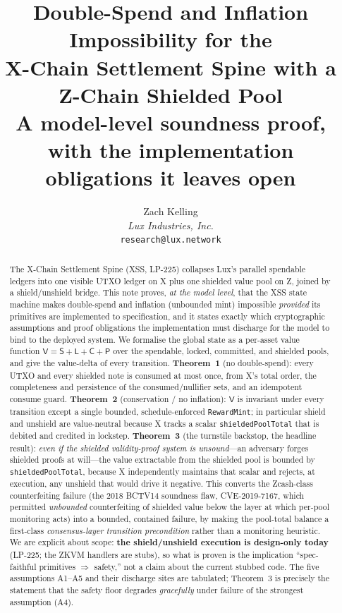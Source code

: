 \documentclass[11pt]{article}
\title{Double-Spend and Inflation Impossibility for the\\
       X-Chain Settlement Spine with a Z-Chain Shielded Pool\\
       {\large A model-level soundness proof, with the implementation
       obligations it leaves open}}
\author{Zach Kelling \\
\textit{Lux Industries, Inc.}\\
\texttt{research@lux.network}}
\date{}
\theoremstyle{definition}
\theoremstyle{remark}
\newcommand{\Val}{\mathsf{V}}
\newcommand{\spend}{\mathsf{S}}
\newcommand{\lock}{\mathsf{L}}
\newcommand{\commit}{\mathsf{C}}
\newcommand{\pool}{\mathsf{P}}
\begin{document}
\maketitle

\begin{abstract}
The X-Chain Settlement Spine (XSS, LP-225) collapses Lux's parallel
spendable ledgers into one visible UTXO ledger on X plus one shielded
value pool on Z, joined by a shield/unshield bridge. This note proves,
\emph{at the model level}, that the XSS state machine makes double-spend
and inflation (unbounded mint) impossible \emph{provided} its primitives
are implemented to specification, and it states exactly which
cryptographic assumptions and proof obligations the implementation must
discharge for the model to bind to the deployed system. We formalise the
global state as a per-asset value function
$\Val = \spend + \lock + \commit + \pool$ over the spendable, locked,
committed, and shielded pools, and give the value-delta of every
transition. \textbf{Theorem~1} (no double-spend): every UTXO and every
shielded note is consumed at most once, from X's total order, the
completeness and persistence of the consumed/nullifier sets, and an
idempotent consume guard. \textbf{Theorem~2} (conservation / no
inflation): $\Val$ is invariant under every transition except a single
bounded, schedule-enforced \texttt{RewardMint}; in particular shield and
unshield are value-neutral because X tracks a scalar
\texttt{shieldedPoolTotal} that is debited and credited in lockstep.
\textbf{Theorem~3} (the turnstile backstop, the headline result):
\emph{even if the shielded validity-proof system is unsound}---an
adversary forges shielded proofs at will---the value extractable from the
shielded pool is bounded by \texttt{shieldedPoolTotal}, because X
independently maintains that scalar and rejects, at execution, any
unshield that would drive it negative. This converts the Zcash-class
counterfeiting failure (the 2018 BCTV14 soundness flaw, CVE-2019-7167,
which permitted \emph{unbounded} counterfeiting of shielded value below
the layer at which per-pool monitoring acts) into a bounded, contained
failure, by making the pool-total balance a first-class
\emph{consensus-layer transition precondition} rather than a monitoring
heuristic. We are explicit about scope: \textbf{the shield/unshield
execution is design-only today} (LP-225; the ZKVM handlers are stubs),
so what is proven is the implication ``spec-faithful primitives $\Rightarrow$
safety,'' not a claim about the current stubbed code. The five assumptions
A1--A5 and their discharge sites are tabulated; Theorem~3 is precisely the
statement that the safety floor degrades \emph{gracefully} under failure
of the strongest assumption (A4).
\end{abstract}
\end{document}
